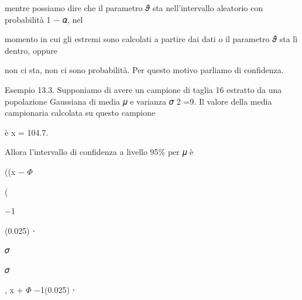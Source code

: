 \documentclass[a4paper,portrait,12pt]{article}
\begin{document}
\begin{flushleft}
mentre possiamo dire che il parametro 𝜗 sta nell'intervallo aleatorio con probabilit\`{a} 1 $-$ 𝛼, nel
\end{flushleft}


\begin{flushleft}
momento in cui gli estremi sono calcolati a partire dai dati o il parametro 𝜗 sta lì dentro, oppure
\end{flushleft}


\begin{flushleft}
non ci sta, non ci sono probabilit\`{a}. Per questo motivo parliamo di confidenza.
\end{flushleft}


\begin{flushleft}
Esempio 13.3. Supponiamo di avere un campione di taglia 16 estratto da una popolazione Gaussiana di media 𝜇 e varianza 𝜎 2 =9. Il valore della media campionaria calcolata su questo campione
\end{flushleft}


\begin{flushleft}
\`{e} x = 104.7.
\end{flushleft}


\begin{flushleft}
Allora l'intervallo di confidenza a livello 95\% per 𝜇 \`{e}
\end{flushleft}





\begin{flushleft}
((x $-$ $\Phi$
\end{flushleft}


(





$-$1





(0.025) ⋅





\begin{flushleft}
𝜎
\end{flushleft}


\begin{flushleft}
𝜎
\end{flushleft}


\begin{flushleft}
, x + $\Phi$ $-$1(0.025) ⋅
\end{flushleft}
\end{document}
